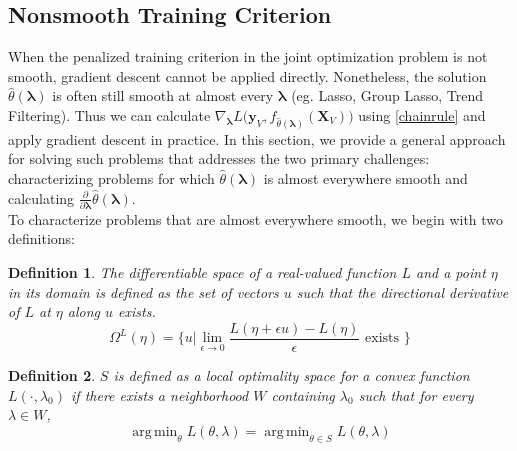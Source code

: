 \documentclass[10pt,letterpaper]{article}
\newtheorem{definition}{Definition}
\DeclareMathOperator*{\argmin}{arg\,min}
\begin{document}
\subsection{Nonsmooth Training Criterion}
When the penalized training criterion in the joint optimization problem is not smooth, gradient descent cannot be applied directly. Nonetheless, the solution $\hat{\theta}\left(\boldsymbol{\lambda}\right)$ is often still smooth at almost every $\boldsymbol{\lambda}$ (eg. Lasso, Group Lasso, Trend Filtering). Thus we can calculate $\nabla_{\boldsymbol{\lambda}} L \Big( \boldsymbol{y}_V, f_{\hat{\theta}(\boldsymbol{\lambda})}(\boldsymbol{X}_V) \Big )$ using \eqref{chainrule} and apply gradient descent in practice. In this section, we provide a general approach for solving such problems that addresses the two primary challenges: characterizing problems for which $\hat{\theta}\left(\boldsymbol{\lambda}\right)$ is almost everywhere smooth and calculating $\frac{\partial}{\partial \boldsymbol{\lambda}} \hat{\theta}(\boldsymbol{\lambda})$.\\

\vspace{2mm}
To characterize problems that are almost everywhere smooth, we begin with two definitions:
\begin{definition}
The differentiable space of a real-valued function $L$ and a point $\eta$ in its domain is defined as the set of vectors $u$ such that the directional derivative of $L$ at $\eta$ along $u$ exists.
\begin{equation}
\Omega^{L}(\eta) = \Big\{ u | \lim_{\epsilon \rightarrow 0} \frac{L(\eta + \epsilon u) - L(\eta)}{\epsilon} \text{ exists } \Big\}
\end{equation}
\end{definition}

\begin{definition}
$S$ is defined as a local optimality space for a convex function $L(\cdot, \lambda_0)$ if there exists a neighborhood $W$ containing $\lambda_0$ such that for every $\lambda \in W$,
\begin{equation}
\argmin_\theta L(\theta, \lambda) = \argmin_{\theta \in S} L(\theta, \lambda)
\end{equation}
\end{definition}
\end{document}
